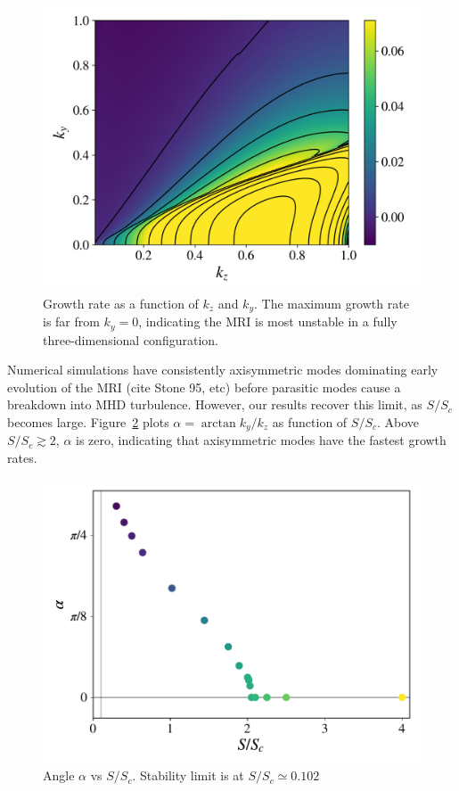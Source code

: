 \documentclass[aps,prl, reprint,superscriptaddress]{revtex4-1}
\newcommand{\SSC}{S/S_{c}}
\begin{document}
\begin{figure}[h]
  \includegraphics[width=\columnwidth]{run_13_output_growthrates.png}
  \caption{Growth rate as a function of $k_z$ and $k_y$. The maximum growth rate is far from $k_y = 0$, indicating the MRI is most unstable in a fully three-dimensional configuration.}
  \label{fig:growth_rate}
\end{figure}

Numerical simulations have consistently axisymmetric modes dominating early evolution of the MRI (cite Stone 95, etc) before parasitic modes cause a breakdown into MHD turbulence. However, our results recover this limit, as $\SSC$ becomes large. Figure~\ref{fig:alpha} plots $\alpha = \arctan k_y/k_z$ as  function of $\SSC$. Above $\SSC \gtrsim 2$, $\alpha$ is zero, indicating that axisymmetric modes have the fastest growth rates.

\begin{figure}[h]
  \includegraphics[width=\columnwidth]{alpha_vs_ssc_grid.pdf}
  \caption{Angle $\alpha$ vs $\SSC$. Stability limit is at $\SSC \simeq 0.102$}
  \label{fig:alpha}
\end{figure}
\end{document}
